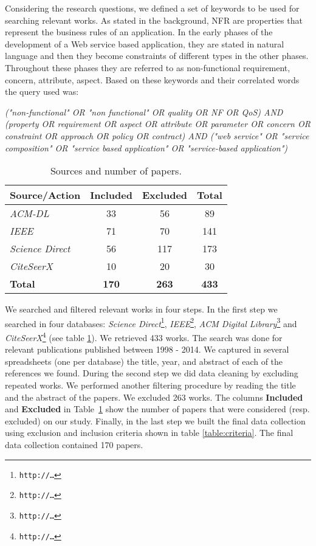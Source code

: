 Considering the research questions, we defined a set of keywords to be used for searching relevant works. As stated in the background, NFR are properties that represent the business rules of an application. In the early phases of the development of a Web service based application, they are stated in natural language and then they become constraints of different types in the other phases. Throughout these phases they are referred to as non-functional requirement, concern, attribute, aspect. Based on these keywords and their correlated words the query used was:

{\em ("non-functional" OR "non functional" OR quality OR NF OR QoS) AND (property OR requirement OR aspect OR attribute OR parameter OR concern OR constraint OR approach OR policy OR contract) AND ("web service" OR "service composition" OR "service based application" OR "service-based application")
}

\begin{table}\centering
\begin{tabular}{|l|c|c|c|} \hline
\textbf{Source/Action}	& \textbf{Included}	& \textbf{Excluded}	& \textbf{Total}	\\ \hline
\textit{ACM-DL}				& 33								& 56								& 89						\\ \hline
\textit{IEEE}						& 71								& 70								& 141					\\ \hline
\textit{Science Direct}	& 56								& 117							& 173					\\ \hline
\textit{CiteSeerX}			& 10								& 20								& 30						\\ \hline
\textbf{Total}					& \textbf{170}			& \textbf{263}			& \textbf{433}	\\ \hline
\end{tabular}
\caption{\label{table:Sources}Sources and number of papers.}
\end{table}

We searched and filtered relevant works in four steps. In the first  step we searched in four databases: \textit{Science Direct}\footnote{\tt http://\dots}, \textit{IEEE}\footnote{\tt http://\dots}, \textit{ACM Digital Library}\footnote{\tt http://\dots} and \textit{CiteSeerX}\footnote{\tt http://\dots} (see table \ref{table:Sources}). We retrieved 433 works. The search was done for relevant publications published between 1998 - 2014. We captured in several spreadsheets (one per database) the title, year,  and abstract of each of the references we found. During the second step we did data cleaning by excluding repeated works.  We performed another filtering procedure by reading the title and the abstract of the papers. We excluded 263 works. The columns \textbf{Included} and \textbf{Excluded} in Table~\ref{table:Sources} show the number of papers that were considered (resp. excluded) on our study.
Finally, in the last step we built   the final data collection using exclusion and inclusion criteria shown in table \ref{table:criteria}. The final data collection contained 170 papers.


